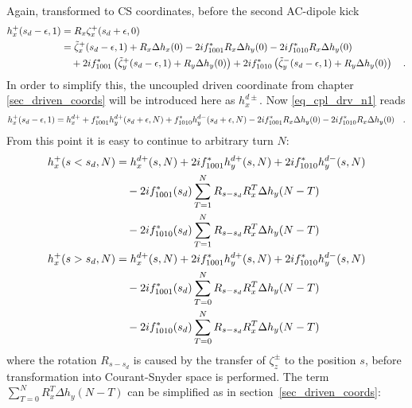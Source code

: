 %
Again, transformed to CS coordinates, before the second AC-dipole kick
%
\begin{align}
    h_x^+(s_d-\epsilon, 1) &=R_x\zeta_x^+(s_d+\epsilon, 0) \notag \\
        &=
        \tilde{\zeta}_x^+(s_d-\epsilon, 1) + R_x\Delta h_x(0)
            - 2if_{1001}^* R_x\Delta h_y(0)
            - 2if_{1010}^* R_x\Delta h_y(0)
        \notag \\ &\quad 
            + 2if_{1001}^* \left(\tilde{\zeta}_y^+(s_d-\epsilon, 1) + R_y\Delta h_y(0) \right)
            + 2if_{1010}^* \left(\tilde{\zeta}_y^-(s_d-\epsilon, 1) + R_y\Delta h_y(0) \right)
    \quad .
    \label{eq_cpl_drv_n1}
\end{align}
%
In order to simplify this, the uncoupled driven coordinate from chapter \ref{sec_driven_coords} will
be introduced here as $h_x^{d\pm}$.
Now \eqref{eq_cpl_drv_n1} reads
%
\begin{equation}
    h_x^+(s_d-\epsilon, 1)
        = h_x^{d+} + f_{1001}^* h_y^{d+}(s_d+\epsilon, N) + f_{1010}^* h_y^{d-}(s_d+\epsilon, N) 
            - 2if_{1001}^* R_x\Delta h_y(0)
            - 2if_{1010}^* R_x\Delta h_y(0)
    \quad .
\end{equation}
%
From this point it is easy to continue to arbitrary turn $N$:
%
\begin{align}
    h_x^+(s<s_d, N) &= h_x^{d+}(s,N)
        + 2if_{1001}^* h_y^{d+} (s, N)
        + 2if_{1010}^* h_y^{d-} (s, N) \notag \\
        & \quad - 2if_{1001}^*(s_d) \sum\limits_{T = 1}^N R_{s-s_d}R_x^{T}\Delta h_y(N-T) \notag \\
        & \quad - 2if_{1010}^*(s_d) \sum\limits_{T = 1}^N R_{s-s_d}R_x^{T}\Delta h_y(N-T)
        \notag \\
    h_x^+(s>s_d, N) &= h_x^{d+}(s,N)
        + 2if_{1001}^* h_y^{d+} (s, N)
        + 2if_{1010}^* h_y^{d-} (s, N) \notag \\
        & \quad - 2if_{1001}^*(s_d) \sum\limits_{T = 0}^N R_{s-s_d}R_x^{T}\Delta h_y(N-T) \notag \\
        & \quad - 2if_{1010}^*(s_d) \sum\limits_{T = 0}^N R_{s-s_d}R_x^{T}\Delta h_y(N-T)
\end{align}
%
where the rotation $R_{s-s_d}$ is caused by the transfer of $\zeta_z^\pm$ to the position $s$,
before transformation into Courant-Snyder space is performed. 
The term $\sum\limits_{T = 0}^N R_x^{T}\Delta h_y(N-T) $ can be simplified as in section~\ref{sec_driven_coords}:
